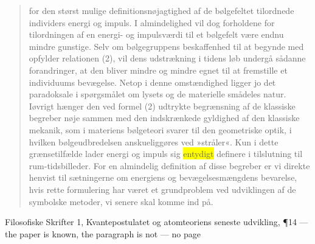 \documentclass[11pt]{article}
\newcommand{\dcite}[1]{{\nopagebreak\raggedleft\small #1\par}\medskip}
\newcommand{\tlg}[1]{{\setlength{\fboxsep}{0.8pt}\colorbox{yellow}{#1}}}
\begin{document}
\begin{quote}
for den størst mulige definitionsnøjagtighed af de bølgefeltet tilordnede individers energi og impuls. I almindelighed vil dog forholdene for tilordningen af en energi- og impulsværdi til et bølgefelt være endnu mindre gunstige. Selv om bølgegruppens beskaffenhed til at begynde med opfylder relationen (2), vil dens udstrækning i tidens løb undergå sådanne forandringer, at den bliver mindre og mindre egnet til at fremstille et individuums bevægelse. Netop i denne omstændighed ligger jo det paradoksale i spørgsmålet om lysets og de materielle smådeles natur. Iøvrigt hænger den ved formel (2) udtrykte begrænsning af de klassiske begreber nøje sammen med den indskrænkede gyldighed af den klassiske mekanik, som i materiens bølgeteori svarer til den geometriske optik, i hvilken bølgeudbredelsen anskueliggøres ved »stråler«. Kun i dette grænsetilfælde lader energi og impuls sig \tlg{entydigt} definere i tilslutning til rum-tidsbilleder. For en almindelig definition af disse begreber er vi direkte henvist til sætningerne om energiens og bevægelsesmængdens bevarelse, hvis rette formulering har været et grundproblem ved udviklingen af de symbolske metoder, vi senere skal komme ind på.
\end{quote}
\dcite{Filosofiske Skrifter 1, Kvantepostulatet og atomteoriens seneste udvikling, ¶14 — the paper is known, the paragraph is not — no page}
\end{document}
